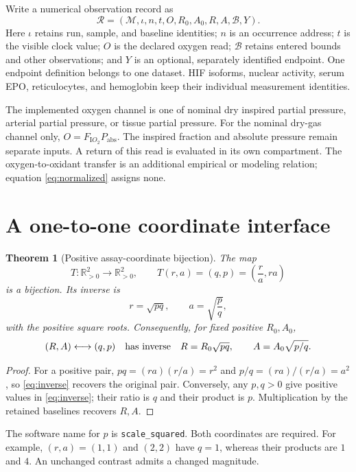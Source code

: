 \documentclass[11pt]{article}
\newtheorem{theorem}{Theorem}
\newcommand{\pos}{\mathbb R_{>0}}
\newcommand{\code}[1]{\nolinkurl{#1}}
\begin{document}
Write a numerical observation record as
\begin{equation}\label{eq:record}
 \mathcal R=(\mathcal M,\iota,n,t,O,R_0,A_0,R,A,\mathcal B,Y).
\end{equation}
Here \(\iota\) retains run, sample, and baseline identities; \(n\) is an
occurrence address; \(t\) is the visible clock value; \(O\) is the declared
oxygen read; \(\mathcal B\) retains entered bounds and other observations;
and \(Y\) is an optional, separately identified endpoint. One endpoint
definition belongs to one dataset. HIF isoforms, nuclear activity, serum EPO,
reticulocytes, and hemoglobin keep their individual measurement identities.

The implemented oxygen channel is one of nominal dry inspired partial
pressure, arterial partial pressure, or tissue partial pressure. For the
nominal dry-gas channel only, \(O=F_{\mathrm IO_2}P_{\mathrm{abs}}\).
The inspired fraction and absolute pressure remain separate inputs.
A return of this read is evaluated in its own compartment. The
oxygen-to-oxidant transfer is an additional empirical or modeling relation;
equation \eqref{eq:normalized} assigns none.

\section{A one-to-one coordinate interface}

\begin{theorem}[Positive assay-coordinate bijection]\label{thm:bijection}
The map
\[
 T:\pos^2\longrightarrow\pos^2,\qquad
 T(r,a)=(q,p)=\left(\frac r a,ra\right)
\]
is a bijection. Its inverse is
\begin{equation}\label{eq:inverse}
 r=\sqrt{pq},\qquad a=\sqrt{\frac p q},
\end{equation}
with the positive square roots. Consequently, for fixed positive \(R_0,A_0\),
\[
 (R,A)\longleftrightarrow(q,p)
 \quad\hbox{has inverse}\quad
 R=R_0\sqrt{pq},\qquad A=A_0\sqrt{p/q}.
\]
\end{theorem}
\begin{proof}
For a positive pair, \(pq=(ra)(r/a)=r^2\) and
\(p/q=(ra)/(r/a)=a^2\), so \eqref{eq:inverse} recovers the original
pair. Conversely, any \(p,q>0\) give positive values in
\eqref{eq:inverse}; their ratio is \(q\) and their product is \(p\).
Multiplication by the retained baselines recovers \(R,A\).
\end{proof}

The software name for \(p\) is \code{scale_squared}. Both coordinates
are required. For example, \((r,a)=(1,1)\) and \((2,2)\) have \(q=1\),
whereas their products are \(1\) and \(4\). An unchanged contrast admits
a changed magnitude.
\end{document}
